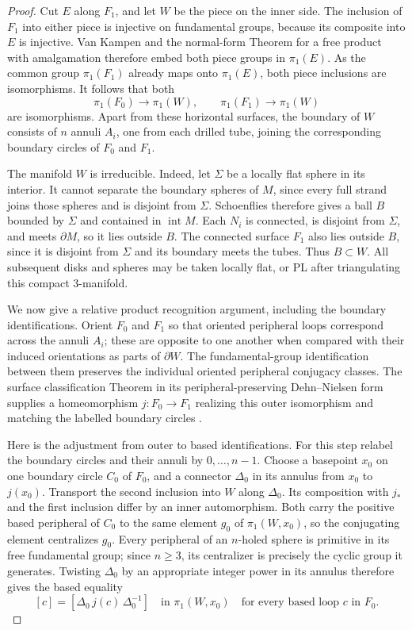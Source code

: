 \begin{proof}
Cut $E$ along $F_1$, and let $W$ be the piece on the inner side.
The inclusion of $F_1$ into either piece is injective on fundamental
groups, because its composite into $E$ is injective.  Van Kampen and
the normal-form Theorem for a free product with amalgamation therefore
embed both piece groups in $\pi_1(E)$.  As the common group
$\pi_1(F_1)$ already maps onto $\pi_1(E)$, both piece inclusions are
isomorphisms.  It follows that both
\[
 \pi_1(F_0)\longrightarrow\pi_1(W),\qquad
 \pi_1(F_1)\longrightarrow\pi_1(W)
\]
are isomorphisms.  Apart from these horizontal surfaces, the boundary
of $W$ consists of $n$ annuli $A_i$, one from each drilled tube, joining
the corresponding boundary circles of $F_0$ and $F_1$.

The manifold $W$ is irreducible.  Indeed, let $\Sigma$ be a locally
flat sphere in its interior.  It cannot separate the boundary spheres
of $M$, since every full strand joins those spheres and is disjoint
from $\Sigma$.  Schoenflies therefore gives a ball $B$ bounded by
$\Sigma$ and contained in $\operatorname{int}M$.  Each $N_i$ is connected,
is disjoint from $\Sigma$, and meets $\partial M$, so it lies outside
$B$.  The connected surface $F_1$ also lies outside $B$, since it is
disjoint from $\Sigma$ and its boundary meets the tubes.  Thus
$B\subset W$.  All subsequent disks and spheres may be taken locally
flat, or PL after triangulating this compact $3$-manifold.

We now give a relative product recognition argument, including the
boundary identifications.  Orient $F_0$ and $F_1$ so that oriented
peripheral loops correspond across the annuli $A_i$; these are opposite
to one another when compared with their induced orientations as parts
of $\partial W$.  The fundamental-group identification between them
preserves the individual oriented peripheral conjugacy classes.
The surface classification Theorem in its peripheral-preserving
Dehn--Nielsen form supplies a homeomorphism
$j:F_0\to F_1$ realizing this outer isomorphism and matching the labelled
boundary circles \cite[Theorem~8.8 and Proposition~3.19]{FarbMargalit2012}.

Here is the adjustment from outer to based identifications.  For this
step relabel the boundary circles and their annuli by $0,\ldots,n-1$.
Choose
a basepoint $x_0$ on one boundary circle $C_0$ of $F_0$, and a connector
$\Delta_0$ in its annulus from $x_0$ to $j(x_0)$.  Transport the second
inclusion into $W$ along $\Delta_0$.  Its composition with $j_*$ and
the first inclusion differ by an inner automorphism.  Both carry the
positive based peripheral of $C_0$ to the same element $g_0$ of
$\pi_1(W,x_0)$, so the conjugating element centralizes $g_0$.
Every peripheral of an $n$-holed sphere is primitive in its free
fundamental group; since $n\geq3$, its centralizer is precisely the
cyclic group it generates.  Twisting $\Delta_0$ by an appropriate
integer power in its annulus therefore gives the based equality
\[
 [c]=[\Delta_0\,j(c)\,\Delta_0^{-1}]
 \quad\text{in }\pi_1(W,x_0)
 \quad\text{for every based loop }c\text{ in }F_0.
 \tag{*}
\]


\end{proof}
